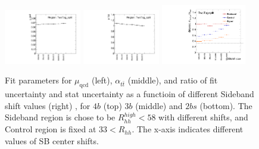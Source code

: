 \begin{figure}[htbp!]
\begin{center}
\includegraphics[width=0.3\textwidth,angle=-90]{figures/boosted/Appendix_SB/TwoTag_split_muqcdSBshift.pdf}
\includegraphics[width=0.3\textwidth,angle=-90]{figures/boosted/Appendix_SB/TwoTag_split_mutopSBshift.pdf}
\includegraphics[width=0.33\textwidth,angle=-90]{figures/boosted/Appendix_SB/data_est_TwoTag_split_sigma_compareSBshift.pdf}
  \caption{Fit parameters for $\mu_{\text{qcd}}$ (left), $\alpha_{t\bar{t}}$ (middle), and ratio of fit uncertainty and stat uncertainty as a functioin of different Sideband shift values (right) , for $4b$ (top) $3b$ (middle) and $2bs$ (bottom). The Sideband region is chose to be $R_{hh}^{high} < 58$ with different shifts, and Control region is fixed at $33 < R_{hh}$. The x-axis indicates different values of SB center shifts.}
  \label{fig:app-sb-muqcd-diffSBshift}
\end{center}
\end{figure}


